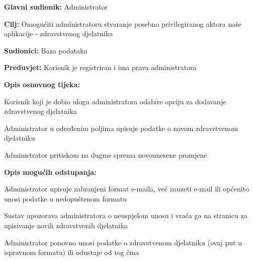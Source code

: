 \noindent {}
\begin{packed_item}
	
	\item \textbf{Glavni sudionik: }Administrator
	\item  \textbf{Cilj:} Omogućiti administratoru stvaranje posebno privilegiranog aktora naše aplikacije - zdravstvenog djelatnika
	\item  \textbf{Sudionici:} Baza podataka
	\item  \textbf{Preduvjet:} Korisnik je registriran i ima prava administratora
	\item  \textbf{Opis osnovnog tijeka:}
	
	\item[] \begin{packed_enum}
		
		\item Korisnik koji je dobio ulogu administratora odabire opciju za dodavanje zdravstvenog djelatnika
		\item Administrator u određenim poljima upisuje podatke o novom zdravstvenom djelatniku
		\item Administrator pritiskom na dugme sprema novounesene promjene
	\end{packed_enum}
	
	\item  \textbf{Opis mogućih odstupanja:}
	
	\item[] \begin{packed_item}
		
		\item[2.a] Administrator upisuje zabranjeni format e-maila, već zauzeti e-mail ili općenito unosi podatke u nedopuštenom formatu
		\item[] \begin{packed_enum}
			
			\item Sustav upozorava administratora o neuspjelom unosu i vraća ga na stranicu za upisivanje novih zdravstvenih djelatnika
			\item Administrator ponovno unosi podatke o zdravstvenom djelatniku (ovaj put u ispravnom formatu) ili odustaje od tog čina
			
		\end{packed_enum}
		
	\end{packed_item}
	
\end{packed_item}


